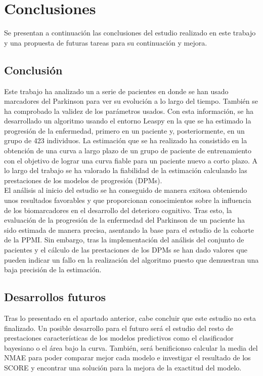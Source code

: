 \chapter{Conclusiones}

Se presentan a continuación las conclusiones del estudio realizado en este trabajo y una propuesta de futuras tareas para su continuación y mejora. 


\section{Conclusión}
 
Este trabajo ha analizado un a serie de pacientes en donde se han usado marcadores del Parkinson para ver su evolución a lo largo del tiempo. También se ha comprobado la validez de los parámetros usados. Con esta información, se ha desarrollado un algoritmo usando el entorno Leaspy en la que se ha estimado la progresión de la enfermedad, primero en un paciente y, posteriormente, en un grupo de 423 individuos. La estimación que se ha realizado ha consistido en la obtención de una curva a largo plazo de un grupo de paciente de entrenamiento con el objetivo de lograr una curva fiable para un paciente nuevo a corto plazo. A lo largo del trabajo se ha valorado la fiabilidad de la estimación calculando las prestaciones de los modelos de progresión (DPMs). \\

El análisis al inicio del estudio se ha conseguido de manera exitosa obteniendo unos resultados favorables y que proporcionan conocimientos sobre la influencia de los biomarcadores en el desarrollo del deterioro cognitivo. Tras esto, la evaluación de la progresión de la enfermedad del Parkinson de un paciente ha sido estimada de manera precisa, asentando la base para el estudio de la cohorte de la PPMI. Sin embargo, tras la implementación del análisis del conjunto de pacientes y el cálculo de las prestaciones de los DPMs se han dado valores que pueden indicar un fallo en la realización del algoritmo puesto que demuestran una baja precisión de la estimación.


\section{Desarrollos futuros}
Tras lo presentado en el apartado anterior, cabe concluir que este estudio no esta finalizado.
Un posible desarrollo para el futuro será el estudio del resto de prestaciones características de los modelos predictivos como el clasificador bayesiano o el área bajo la curva. También, será benificionso calcular la media del NMAE para poder comparar mejor cada modelo e investigar el resultado de los SCORE y encontrar una solución para la mejora de la exactitud del modelo.